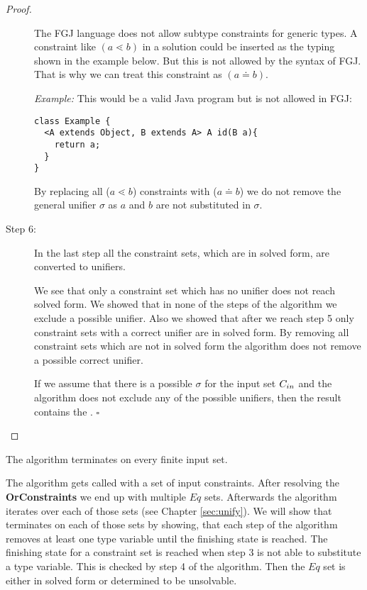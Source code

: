 \begin{proof}
\begin{description}

The FGJ language does not allow subtype constraints for generic types.
A constraint like $(a \lessdot b)$ in a solution could be inserted as the typing shown in the example below.
But this is not allowed by the syntax of FGJ.
That is why we can treat this constraint as $(a \doteq b)$.


\textit{Example:}
This would be a valid Java program but is not allowed in FGJ:
\begin{lstlisting}
class Example {
  <A extends Object, B extends A> A id(B a){
    return a;
  }
}
\end{lstlisting}

By replacing all ($a \lessdot b$) constraints with ($a \doteq b$) we
  do not remove the general unifier $\sigma$ as $a$ and $b$ are not substituted
  in $\sigma$. 

\item[Step 6:]
In the last step all the constraint sets, which are in solved form, are converted to unifiers.

We see that only a constraint set which has no unifier does not reach solved form.
We showed that in none of the steps of the \unify{} algorithm we exclude a possible unifier.
Also we showed that after we reach step 5 only constraint sets with a correct unifier are in solved form.
By removing all constraint sets which are not in solved form the algorithm does not
remove a possible correct unifier.

If we assume that there is a possible  $\sigma$ for the input set $C_{in}$
and the \unify{} algorithm does not exclude any of the possible unifiers,
then the result \unify{} contains the .
\hfill $\square$
\end{description}
\end{proof}

\begin{theorem}[Termination]\label{theo:unifyTermination}
  The \unify{} algorithm terminates on every finite input set.
\end{theorem}
The \unify{} algorithm gets called with a set of input constraints.
After resolving the \textbf{OrConstraints} we end up with multiple $Eq$ sets.
Afterwards the algorithm iterates over each of those sets (see Chapter \ref{sec:unify}).
We will show that \unify{} terminates on each of those sets by showing,
that each step of the algorithm removes at least one type variable
until the finishing state is reached.
The finishing state for a constraint set is reached when step 3 is not able to substitute a type variable.
This is checked by step 4 of the algorithm.
Then the $Eq$ set is either in solved form or determined to be unsolvable.

